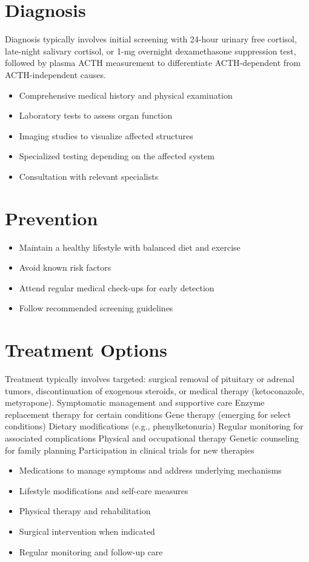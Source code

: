 \section{Diagnosis}
Diagnosis typically involves initial screening with 24-hour urinary free cortisol, late-night salivary cortisol, or 1-mg overnight dexamethasone suppression test, followed by plasma ACTH measurement to differentiate ACTH-dependent from ACTH-independent causes.

\begin{itemize}[noitemsep]
  \item Comprehensive medical history and physical examination
  \item Laboratory tests to assess organ function
  \item Imaging studies to visualize affected structures
  \item Specialized testing depending on the affected system
  \item Consultation with relevant specialists
\end{itemize}
\section{Prevention}
\begin{itemize}[noitemsep]
  \item Maintain a healthy lifestyle with balanced diet and exercise
  \item Avoid known risk factors
  \item Attend regular medical check-ups for early detection
  \item Follow recommended screening guidelines
\end{itemize}
\section{Treatment Options}
Treatment typically involves targeted: surgical removal of pituitary or adrenal tumors, discontinuation of exogenous steroids, or medical therapy (ketoconazole, metyrapone). Symptomatic management and supportive care Enzyme replacement therapy for certain conditions Gene therapy (emerging for select conditions) Dietary modifications (e.g., phenylketonuria) Regular monitoring for associated complications Physical and occupational therapy Genetic counseling for family planning Participation in clinical trials for new therapies

\begin{itemize}[noitemsep]
  \item Medications to manage symptoms and address underlying mechanisms
  \item Lifestyle modifications and self-care measures
  \item Physical therapy and rehabilitation
  \item Surgical intervention when indicated
  \item Regular monitoring and follow-up care
\end{itemize}
